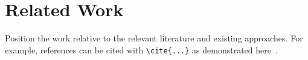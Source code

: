 \section{Related Work}
\label{sec:related-work}

Position the work relative to the relevant literature and existing approaches.
For example, references can be cited with \verb|\cite{...}| as demonstrated here~\cite{example2026}.
